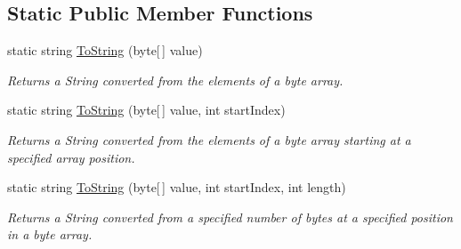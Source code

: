 \subsection*{Static Public Member Functions}
\begin{DoxyCompactItemize}
\item 
static string \mbox{\hyperlink{class_t_net_1_1_i_o_1_1_endian_bit_converter_a2d1c19944491257c2f73b50a39034bac}{To\+String}} (byte\mbox{[}$\,$\mbox{]} value)
\begin{DoxyCompactList}\small\item\em Returns a String converted from the elements of a byte array. \end{DoxyCompactList}\item 
static string \mbox{\hyperlink{class_t_net_1_1_i_o_1_1_endian_bit_converter_a28aabc2bed261bbd287911df84512dcd}{To\+String}} (byte\mbox{[}$\,$\mbox{]} value, int start\+Index)
\begin{DoxyCompactList}\small\item\em Returns a String converted from the elements of a byte array starting at a specified array position. \end{DoxyCompactList}\item 
static string \mbox{\hyperlink{class_t_net_1_1_i_o_1_1_endian_bit_converter_abfe5a9033c0f14fbfa209af61cee5124}{To\+String}} (byte\mbox{[}$\,$\mbox{]} value, int start\+Index, int length)
\begin{DoxyCompactList}\small\item\em Returns a String converted from a specified number of bytes at a specified position in a byte array. \end{DoxyCompactList}\end{DoxyCompactItemize}
